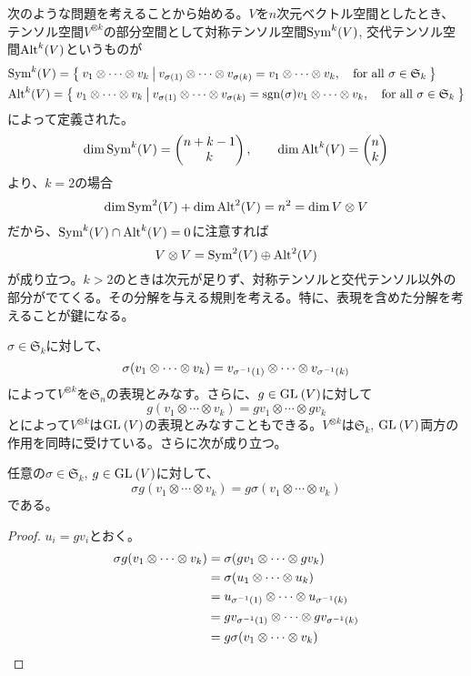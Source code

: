\documentclass{ltjsreport}
\begin{document}
次のような問題を考えることから始める。$V$を$n$次元ベクトル空間としたとき、テンソル空間$V^{\otimes k}$の部分空間として対称テンソル空間$\text{Sym}^k(V)$, 交代テンソル空間$\text{Alt}^k(V)$というものが
\begin{align*}
  &\text{Sym}^k(V)=\left\{\:v_1\otimes\cdots\otimes v_k\:\middle|\:v_{\sigma(1)}\otimes\cdots\otimes v_{\sigma (k)}=v_1\otimes\cdots\otimes v_k,\quad\text{for all $\sigma\in\mathfrak{S}_k$}\:\right\}\\
  &\text{Alt}^k(V)=\left\{\:v_1\otimes\cdots\otimes v_k\:\middle|\:v_{\sigma(1)}\otimes\cdots\otimes v_{\sigma (k)}=\mathrm{sgn}(\sigma)v_1\otimes\cdots\otimes v_k,\quad\text{for all $\sigma\in\mathfrak{S}_k$}\:\right\}
\end{align*}
によって定義された。
\[
\dim\text{Sym}^k(V)=\begin{pmatrix} n+k-1\\k \end{pmatrix},\qquad\dim\text{Alt}^k(V)=\begin{pmatrix} n\\k \end{pmatrix}  
\]
より、$k=2$の場合
\[
\dim\text{Sym}^2(V)+\dim\text{Alt}^2(V)=n^2=\dim V\otimes V  
\]
だから、$\text{Sym}^k(V)\cap\text{Alt}^k(V)=0$に注意すれば
\[
V\otimes V=\text{Sym}^2(V)\oplus\text{Alt}^2(V)  
\]
が成り立つ。$k>2$のときは次元が足りず、対称テンソルと交代テンソル以外の部分がでてくる。その分解を与える規則を考える。特に、表現を含めた分解を考えることが鍵になる。

$\sigma\in \mathfrak{S}_k$に対して、
\[
\sigma(v_1\otimes\cdots\otimes v_k)=v_{\sigma^{-1}(1)}\otimes\cdots\otimes v_{\sigma^{-1}(k)}  
\]
によって$V^{\otimes k}$を$\mathfrak{S}_n$の表現とみなす。さらに、$g\in \text{GL}\:(V)$に対して
\[
g(v_1\otimes\cdots\otimes v_k)=gv_1\otimes\cdots\otimes gv_k  
\]
とによって$V^{\otimes k}$は$\text{GL}\:(V)$の表現とみなすこともできる。$V^{\otimes k}$は$\mathfrak{S}_k$, $\text{GL}\:(V)$両方の作用を同時に受けている。さらに次が成り立つ。

\begin{prop}\label{comm_of_sym_gl}
  任意の$\sigma\in\mathfrak{S}_k$, $g\in\text{GL}\:(V)$に対して、
  \[
  \sigma g(v_1\otimes\cdots\otimes v_k)
  =
  g \sigma(v_1\otimes\cdots\otimes v_k)
  \]
  である。
\end{prop}

\begin{proof}
  $u_i=gv_i$とおく。
  \begin{align*}
    \sigma g(v_1\otimes\cdots\otimes v_k)
    &=\sigma(gv_1\otimes\cdots\otimes gv_k)\\
    &=\sigma(u_1\otimes\cdots\otimes u_k)\\
    &=u_{\sigma^{-1}(1)}\otimes\cdots\otimes u_{\sigma^{-1}(k)}\\
    &=gv_{\sigma^{-1}(1)}\otimes\cdots\otimes gv_{\sigma^{-1}(k)}\\
    &=g\sigma (v_1\otimes\cdots\otimes v_k)
  \end{align*}
\end{proof}
\end{document}
